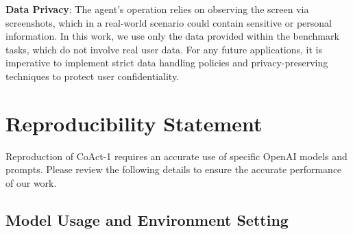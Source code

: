 \documentclass{article} %
\newcommand{\ours}{CoAct-1\xspace}
\begin{document}
\noindent\textbf{Data Privacy}: The agent's operation relies on observing the screen via screenshots, which in a real-world scenario could contain sensitive or personal information. In this work, we use only the data provided within the benchmark tasks, which do not involve real user data. For any future applications, it is imperative to implement strict data handling policies and privacy-preserving techniques to protect user confidentiality.


\section{Reproducibility Statement}
\label{apdx:repduction-statement}
Reproduction of \ours requires an accurate use of specific OpenAI models and prompts. Please review the following details to ensure the accurate performance of our work.

\subsection{Model Usage and Environment Setting}
\end{document}
